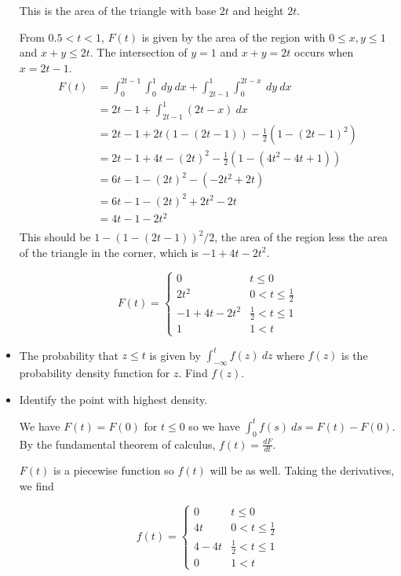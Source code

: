 \documentclass[12pt,letterpaper,noanswers]{exam}
\begin{document}
\begin{questions}
\begin{itemize}
\begin{solution}
This is the area of the triangle with base $2t$ and height $2t$.

From $0.5<t<1$, $F(t)$ is given by the area of the region with $0\leq x,y\leq 1$ and $x+y\leq 2t$.  The intersection of $y=1$ and $x+y = 2t$ occurs when $x = 2t-1$.
\begin{align*}
F(t) &=\int_0^{2t-1} \int_0^1 \ dy\ dx + \int_{2t-1}^1\int_0^{2t-x} \ dy\ dx\\
&= 2t-1+\int_{2t-1}^1(2t-x)\ dx \\
&= 2t-1 + 2t(1-(2t-1))- \frac{1}{2}(1-(2t-1)^2) \\
&= 2t-1 + 4t - (2t)^2- \frac{1}{2}(1-(4t^2-4t+1)) \\
&= 6t-1 - (2t)^2- (-2t^2+2t) \\
&= 6t-1 - (2t)^2+2t^2-2t \\
&= 4t-1 - 2t^2 \\
\end{align*}
This should be $1 - (1-(2t-1))^2/2$, the area of the region less the area of the triangle in the corner, which is $-1+4t-2t^2$.

\[ F(t) = \begin{cases} 
      0 & t\leq 0 \\
      2t^2 & 0<t\leq \frac{1}{2} \\
      -1+4t-2t^2 & \frac{1}{2}< t\leq 1 \\
      1 & 1< t 
   \end{cases}
\]


\end{solution}


\item The probability that $z \leq t$ is given by $\int_{-\infty}^t f(z)\ dz$ where $f(z)$ is the probability density function for $z$.  Find $f(z)$.
\item Identify the point with highest density.
\begin{solution}
We have $F(t) = F(0)$ for $t\leq 0$ so we have $\int_0^t f(s)\ ds = F(t) - F(0)$.  By the fundamental theorem of calculus, $f(t) = \frac{dF}{dt}$.

$F(t)$ is a piecewise function so $f(t)$ will be as well.  Taking the derivatives, we find

\[ f(t) = \begin{cases} 
      0 & t\leq 0 \\
      4t & 0<t\leq \frac{1}{2} \\
      4-4t & \frac{1}{2}< t\leq 1 \\
      0 & 1< t 
   \end{cases}
\]


\end{solution}
\end{itemize}
\end{questions}
\end{document}
